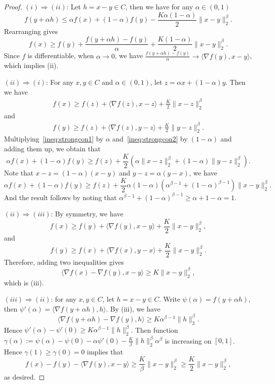 \documentclass[11pt]{article}
\begin{document}
\begin{proof}
    $(i) \Rightarrow (ii)$: Let $h = x - y \in C$, then we have for any $\alpha \in (0, 1)$
    \[
    f(y + \alpha h) \leq \alpha f(x) + (1 - \alpha)f(y) - \frac{K\alpha (1-\alpha)}{2}\|x - y\|_2^\beta. 
    \]
    Rearranging gives 
    \[
    f(x) \geq f(y) + \frac{f(y + \alpha h)-f(y)}{\alpha} + \frac{K (1-\alpha)}{2}\|x - y\|_2^\beta.
    \]
    Since $f$ is differentiable, when $\alpha \to 0$, we have $\frac{f(y + \alpha h)-f(y)}{\alpha}  \to \langle \nabla f(y), x - y \rangle$, which implies (ii). 

    $(ii) \Rightarrow (i)$: For any $x, y \in C$ and $\alpha \in (0, 1)$, let $z = \alpha x + (1-\alpha)y$. Then we have 
    \begin{align}
        f(x) \geq f(z) + \langle \nabla f(z), x - z \rangle + \frac{K}{2}\|x-z\|_2^\beta \label{ineq:strongcon1}
    \end{align}
    and 
    \begin{align}
        f(y) \geq f(z) + \langle \nabla f(z), y - z \rangle + \frac{K}{2}\|y-z\|_2^\beta. \label{ineq:strongcon2}
    \end{align}
    Multiplying~\eqref{ineq:strongcon1} by $\alpha$ and~\eqref{ineq:strongcon2} by $(1 - \alpha)$ and adding them up, we obtain that 
    \[
    \alpha f(x)+(1-\alpha )f(y)\geq f(z)+  \frac{K}{2} (\alpha \|x-z\|_2^\beta+(1-\alpha)\|y-z\|_2^\beta).
    \]
    Note that $x - z = (1-\alpha)(x-y)$ and $y - z = \alpha (y - x)$, we have 
    \[
    \alpha f(x)+(1-\alpha )f(y)\geq f(z)+  \frac{K}{2} \alpha (1-\alpha)(\alpha^{\beta-1} +(1-\alpha)^{\beta-1})\|x-y\|_2^\beta.
    \]
    And the result follows by noting that $\alpha^{\beta-1} +(1-\alpha)^{\beta-1} \geq \alpha + 1-\alpha = 1$. 

    $(ii) \Rightarrow (iii)$: By symmetry, we have 
    \[
    f(x) \geq f(y) + \langle \nabla f(y), x- y \rangle + \frac{K}{2}\|x-y\|_2^\beta,
    \]
    and 
    \[
    f(y) \geq f(x) + \langle \nabla f(x), y - x \rangle + \frac{K}{2}\|x-y\|_2^\beta.
    \]
    Therefore, adding two inequalities gives 
    \[
    \langle \nabla f(x) - \nabla f(y), x - y \rangle \geq K \|x- y\|_2^\beta, 
    \]
    which is (iii). 

    $(iii) \Rightarrow (ii)$: for any $x, y \in C$, let $h = x-y \in C$. Write $\psi (\alpha) = f(y + \alpha h)$, then $\psi'(\alpha) = \langle \nabla f(y+ \alpha h), h \rangle$. By (iii), we have 
    \[
    \langle \nabla f(y + \alpha h) - \nabla f(y),  h\rangle \geq K \alpha^{\beta-1} \|h\|_2^\beta.
    \]
    Hence $\psi'(\alpha) - \psi'(0) \geq K \alpha^{\beta-1}\|h\|_2^\beta$. Then function $\gamma(\alpha):= \psi(\alpha) - \psi(0) - \alpha \psi'(0) - \frac{K}{\beta}\|h\|_2^{\beta}\alpha^\beta$ is increasing on $[0, 1]$. Hence $\gamma(1) \geq \gamma(0) = 0$ implies that 
    \[
    f(x)- f(y) - \langle \nabla f(y),x-y\rangle \geq \frac{K}{\beta}\|x-y\|_2^\beta \geq \frac{K}{2}\|x-y\|_2^\beta,
    \]
    as desired. 
\end{proof}
\end{document}
